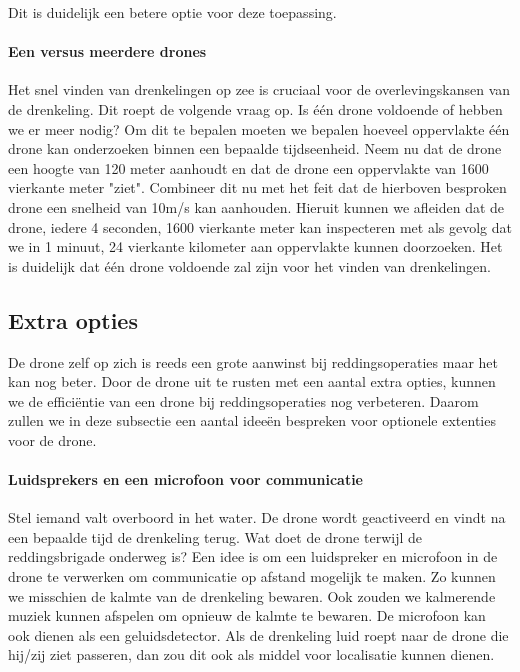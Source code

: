 Dit is duidelijk een betere optie voor deze toepassing.

\paragraph{Een versus meerdere drones}

\subitem
Het snel vinden van drenkelingen op zee is cruciaal voor de overlevingskansen van de drenkeling. Dit roept de volgende vraag op. Is één drone voldoende of hebben we er meer nodig? Om dit te bepalen moeten we bepalen hoeveel oppervlakte één drone kan onderzoeken binnen een bepaalde tijdseenheid. Neem nu dat de drone een hoogte van 120 meter aanhoudt en dat de drone een oppervlakte van 1600 vierkante meter "ziet". Combineer dit nu met het feit dat de hierboven besproken drone een snelheid van 10m/s kan aanhouden. Hieruit kunnen we afleiden dat de drone, iedere 4 seconden, 1600 vierkante meter kan inspecteren met als gevolg dat we in 1 minuut, 24 vierkante kilometer aan oppervlakte kunnen doorzoeken. Het is duidelijk dat één drone voldoende zal zijn voor het vinden van drenkelingen. 

\subsection{Extra opties}

\subitem
De drone zelf op zich is reeds een grote aanwinst bij reddingsoperaties maar het kan nog beter. Door de drone uit te rusten met een aantal extra opties, kunnen we de efficiëntie van een drone bij reddingsoperaties nog verbeteren. Daarom zullen we in deze subsectie een aantal ideeën bespreken voor optionele extenties voor de drone.  

\paragraph{Luidsprekers en een microfoon voor communicatie}

\subitem
Stel iemand valt overboord in het water. De drone wordt geactiveerd en vindt na een bepaalde tijd de drenkeling terug. Wat doet de drone terwijl de reddingsbrigade onderweg is? Een idee is om een luidspreker en microfoon in de drone te verwerken om communicatie op afstand mogelijk te maken. Zo kunnen we misschien de kalmte van de drenkeling bewaren. Ook zouden we kalmerende muziek kunnen afspelen om opnieuw de kalmte te bewaren. 
De microfoon kan ook dienen als een geluidsdetector. Als de drenkeling luid roept naar de drone die hij/zij ziet passeren, dan zou dit ook als middel voor localisatie kunnen dienen.

